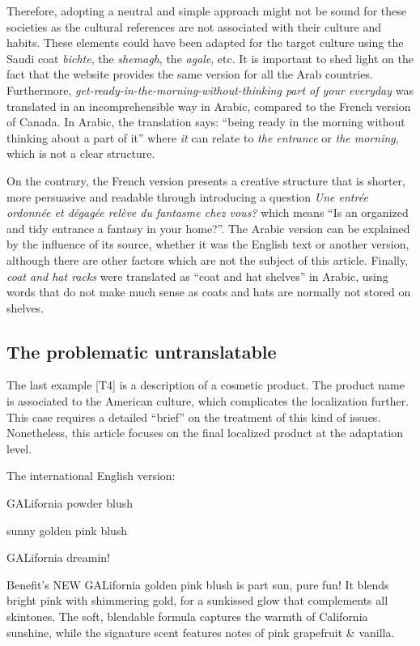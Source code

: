 \documentclass[output=paper]{langsci/langscibook}
\begin{document}
Therefore, adopting a neutral and simple approach might not be sound for these societies as the cultural references are not associated with their culture and habits. These elements could have been adapted for the target culture using the Saudi coat \textit{bichte}, the \textit{shemagh}, the \textit{agale}, etc. It is important to shed light on the fact that the website provides the same version for all the Arab countries. Furthermore, \textit{get-ready-in-the-morning-without-thinking part of your everyday} was translated in an incomprehensible way in Arabic, compared to the French version of Canada. In Arabic, the translation says: \enquote{being ready in the morning without thinking about a part of it} where \textit{it} can relate to \textit{the entrance} or \textit{the morning}, which is not a clear structure.

On the contrary, the French version presents a creative structure that is shorter, more persuasive and readable through introducing a question \textit{Une entrée ordonnée et dégagée relève du fantasme chez vous?} which means \enquote{Is an organized and tidy entrance a fantasy in your home?}. The Arabic version can be explained by the influence of its source, whether it was the English text or another version, although there are other factors which are not the subject of this article. Finally, \textit{coat and hat racks} were translated as \enquote{coat and hat shelves} in Arabic, using words that do not make much sense as coats and hats are normally not stored on shelves. 

\subsection{The problematic untranslatable}

The last example [T4] is a description of a cosmetic product. The product name is associated to the American culture, which complicates the localization further. This case requires a detailed \enquote{brief} on the treatment of this kind of issues. Nonetheless, this article focuses on the final localized product at the adaptation level.

The international English version:

\begin{center}
  GALifornia powder blush

  sunny golden pink blush

  GALifornia dreamin!

  Benefit’s NEW GALifornia golden pink blush is part sun, pure fun! It blends bright pink with shimmering gold, for a sunkissed glow that complements all skintones. The soft, blendable formula captures the warmth of California sunshine, while the signature scent features notes of pink grapefruit \& vanilla.
\end{center}
\end{document}
